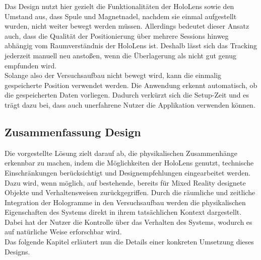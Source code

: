 Das Design nutzt hier gezielt die Funktionalitäten der HoloLens sowie den Umstand aus, dass Spule und Magnetnadel, nachdem sie einmal aufgestellt wurden, nicht weiter bewegt werden müssen. Allerdings bedeutet dieser Ansatz auch, dass die Qualität der Positionierung über mehrere Sessions hinweg abhängig vom Raumverständnis der HoloLens ist. Deshalb lässt sich das Tracking jederzeit manuell neu anstoßen, wenn die Überlagerung als nicht gut genug empfunden wird.\\

Solange also der Versuchsaufbau nicht bewegt wird, kann die einmalig gespeicherte Position verwendet werden. Die Anwendung erkennt automatisch, ob die gespeicherten Daten vorliegen. Dadurch verkürzt sich die Setup-Zeit und es trägt dazu bei, dass auch unerfahrene Nutzer die Applikation verwenden können.




\subsection{Zusammenfassung Design}
\label{sec-4-5}
Die vorgestellte Lösung zielt darauf ab, die physikalischen Zusammenhänge erkennbar zu machen, indem die Möglichkeiten der HoloLens genutzt, technische Einschränkungen berücksichtigt und Designempfehlungen eingearbeitet werden. Dazu wird, wenn möglich, auf bestehende, bereits für Mixed Reality designete Objekte und Verhaltensweisen zurückgegriffen. Durch die räumliche und zeitliche Integration der Hologramme in den Versuchsaufbau werden die physikalischen Eigenschaften des Systems direkt in ihrem tatsächlichen Kontext dargestellt. Dabei hat der Nutzer die Kontrolle über das Verhalten des Systems, wodurch es auf natürliche Weise erforschbar wird.\\

Das folgende Kapitel erläutert nun die Details einer konkreten Umsetzung dieses Designs.


